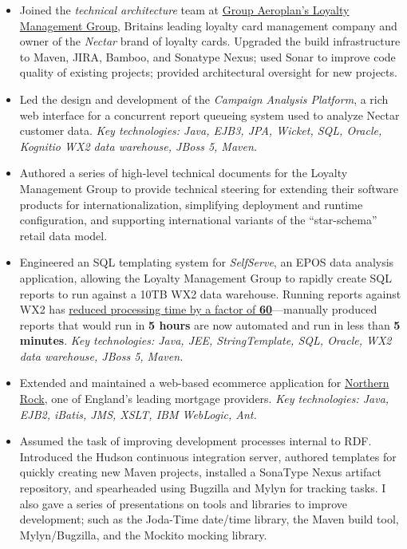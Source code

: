 \documentclass[a4paper,12pt]{article}
\newcommand{\clientwork}[2]{\emph{#1\hfill #2}\nopagebreak}
\begin{document}
\begin{itemize}

\item Joined the \emph{technical architecture} team at \href{http://www.loyalty.co.uk/}{Group Aeroplan's Loyalty Management Group}, Britains leading loyalty card management company and owner of the \emph{Nectar} brand of loyalty cards.  Upgraded the build infrastructure to Maven, JIRA, Bamboo, and Sonatype Nexus; used Sonar to improve code quality of existing projects; provided architectural oversight for new projects.

\item Led the design and development of the \emph{Campaign Analysis Platform}, a rich web interface for a concurrent report queueing system used to analyze Nectar customer data.  \emph{Key technologies: Java, EJB3, JPA, Wicket, SQL, Oracle, Kognitio WX2 data warehouse, JBoss 5, Maven.}

\item Authored a series of high-level technical documents for the Loyalty Management Group to provide technical steering for extending their software products for internationalization, simplifying deployment and runtime configuration, and supporting international variants of the ``star-schema'' retail data model.

\item Engineered an SQL templating system for \emph{SelfServe}, an EPOS data analysis application, allowing the Loyalty Management Group to rapidly create SQL reports to run against a 10TB WX2 data warehouse.  Running reports against WX2 has \href{http://www.kognitio.com/casestudies/casestudy_lmg.php}{reduced processing time by a factor of \textbf{60}}---manually produced reports that would run in \textbf{5 hours} are now automated and run in less than \textbf{5 minutes}.  \emph{Key technologies: Java, JEE, StringTemplate, SQL, Oracle, WX2 data warehouse, JBoss 5, Maven.}

\end{itemize}


\begin{itemize}

\item Extended and maintained a web-based ecommerce application for \href{http://www.northernrock.co.uk}{Northern Rock}, one of England's leading mortgage providers.  \emph{Key technologies: Java, EJB2, iBatis, JMS, XSLT, IBM WebLogic, Ant.}

\item Assumed the task of improving development processes internal to RDF. Introduced the Hudson continuous integration server, authored templates for quickly creating new Maven projects, installed a SonaType Nexus artifact repository, and spearheaded using Bugzilla and Mylyn for tracking tasks.  I also gave a series of presentations on tools and libraries to improve development; such as the Joda-Time date/time library, the Maven build tool, Mylyn/Bugzilla,  and the Mockito mocking library. 

\end{itemize}
\end{document}
